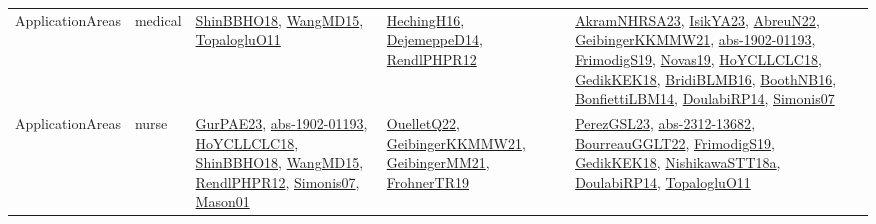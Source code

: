 {\begin{longtable}{lp{3cm}>{\raggedright}p{6cm}>{\raggedright}p{6cm}p{8cm}}
ApplicationAreas & medical & \href{articles/ShinBBHO18.pdf}{ShinBBHO18}\cite{ShinBBHO18}, \href{articles/WangMD15.pdf}{WangMD15}\cite{WangMD15}, \href{articles/TopalogluO11.pdf}{TopalogluO11}\cite{TopalogluO11} & \href{papers/HechingH16.pdf}{HechingH16}\cite{HechingH16}, \href{papers/DejemeppeD14.pdf}{DejemeppeD14}\cite{DejemeppeD14}, \href{papers/RendlPHPR12.pdf}{RendlPHPR12}\cite{RendlPHPR12} & \href{articles/AkramNHRSA23.pdf}{AkramNHRSA23}\cite{AkramNHRSA23}, \href{articles/IsikYA23.pdf}{IsikYA23}\cite{IsikYA23}, \href{articles/AbreuN22.pdf}{AbreuN22}\cite{AbreuN22}, \href{papers/GeibingerKKMMW21.pdf}{GeibingerKKMMW21}\cite{GeibingerKKMMW21}, \href{articles/abs-1902-01193.pdf}{abs-1902-01193}\cite{abs-1902-01193}, \href{papers/FrimodigS19.pdf}{FrimodigS19}\cite{FrimodigS19}, \href{articles/Novas19.pdf}{Novas19}\cite{Novas19}, \href{papers/HoYCLLCLC18.pdf}{HoYCLLCLC18}\cite{HoYCLLCLC18}, \href{articles/GedikKEK18.pdf}{GedikKEK18}\cite{GedikKEK18}, \href{articles/BridiBLMB16.pdf}{BridiBLMB16}\cite{BridiBLMB16}, \href{papers/BoothNB16.pdf}{BoothNB16}\cite{BoothNB16}, \href{articles/BonfiettiLBM14.pdf}{BonfiettiLBM14}\cite{BonfiettiLBM14}, \href{papers/DoulabiRP14.pdf}{DoulabiRP14}\cite{DoulabiRP14}, \href{articles/Simonis07.pdf}{Simonis07}\cite{Simonis07}\\
ApplicationAreas & nurse & \href{articles/GurPAE23.pdf}{GurPAE23}\cite{GurPAE23}, \href{articles/abs-1902-01193.pdf}{abs-1902-01193}\cite{abs-1902-01193}, \href{papers/HoYCLLCLC18.pdf}{HoYCLLCLC18}\cite{HoYCLLCLC18}, \href{articles/ShinBBHO18.pdf}{ShinBBHO18}\cite{ShinBBHO18}, \href{articles/WangMD15.pdf}{WangMD15}\cite{WangMD15}, \href{papers/RendlPHPR12.pdf}{RendlPHPR12}\cite{RendlPHPR12}, \href{articles/Simonis07.pdf}{Simonis07}\cite{Simonis07}, \href{articles/Mason01.pdf}{Mason01}\cite{Mason01} & \href{papers/OuelletQ22.pdf}{OuelletQ22}\cite{OuelletQ22}, \href{papers/GeibingerKKMMW21.pdf}{GeibingerKKMMW21}\cite{GeibingerKKMMW21}, \href{papers/GeibingerMM21.pdf}{GeibingerMM21}\cite{GeibingerMM21}, \href{papers/FrohnerTR19.pdf}{FrohnerTR19}\cite{FrohnerTR19} & \href{papers/PerezGSL23.pdf}{PerezGSL23}\cite{PerezGSL23}, \href{articles/abs-2312-13682.pdf}{abs-2312-13682}\cite{abs-2312-13682}, \href{articles/BourreauGGLT22.pdf}{BourreauGGLT22}\cite{BourreauGGLT22}, \href{papers/FrimodigS19.pdf}{FrimodigS19}\cite{FrimodigS19}, \href{articles/GedikKEK18.pdf}{GedikKEK18}\cite{GedikKEK18}, \href{papers/NishikawaSTT18a.pdf}{NishikawaSTT18a}\cite{NishikawaSTT18a}, \href{papers/DoulabiRP14.pdf}{DoulabiRP14}\cite{DoulabiRP14}, \href{articles/TopalogluO11.pdf}{TopalogluO11}\cite{TopalogluO11}\\

\end{longtable}}
